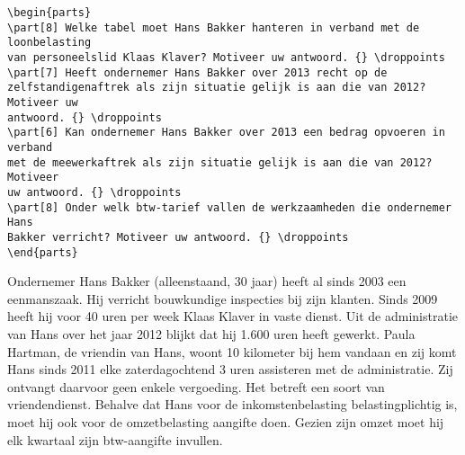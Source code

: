 \documentclass[dutch,a4paper,12pt,addpoints,fleqn,oneside]{tisdexam}
\begin{document}
\begin{questions}
\begin{lstlisting}
\begin{parts}
\part[8] Welke tabel moet Hans Bakker hanteren in verband met de loonbelasting
van personeelslid Klaas Klaver? Motiveer uw antwoord. {} \droppoints
\part[7] Heeft ondernemer Hans Bakker over 2013 recht op de
zelfstandigenaftrek als zijn situatie gelijk is aan die van 2012? Motiveer uw
antwoord. {} \droppoints
\part[6] Kan ondernemer Hans Bakker over 2013 een bedrag opvoeren in verband
met de meewerkaftrek als zijn situatie gelijk is aan die van 2012? Motiveer
uw antwoord. {} \droppoints
\part[8] Onder welk btw-tarief vallen de werkzaamheden die ondernemer Hans
Bakker verricht? Motiveer uw antwoord. {} \droppoints
\end{parts}
\end{lstlisting}

\question
Ondernemer Hans Bakker (alleenstaand, 30 jaar) heeft al sinds 2003 een
eenmanszaak. Hij verricht bouwkundige inspecties bij zijn klanten. Sinds
2009 heeft hij voor 40 uren per week Klaas Klaver in vaste dienst. Uit de
administratie van Hans over het jaar 2012 blijkt dat hij 1.600 uren heeft
gewerkt. Paula Hartman, de vriendin van Hans, woont 10 kilometer bij hem
vandaan en zij komt Hans sinds 2011 elke zaterdagochtend 3 uren assisteren
met de administratie. Zij ontvangt daarvoor geen enkele vergoeding. Het
betreft een soort van vriendendienst. Behalve dat Hans voor de
inkomstenbelasting belastingplichtig is, moet hij ook voor de omzetbelasting
aangifte doen. Gezien zijn omzet moet hij elk kwartaal zijn btw-aangifte
invullen.

\end{questions}
\end{document}
